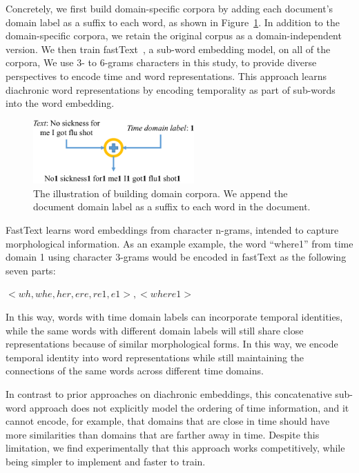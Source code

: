 Concretely,
we first build domain-specific corpora by adding each document's domain label as a suffix to each word, as shown in  Figure~\ref{chap3:fig:domain}. 
In addition to the domain-specific corpora,
we retain the original corpus as a domain-independent version.
We then train fastText~\cite{bojanowski2017enriching}, a sub-word embedding model, on all of the corpora,
We use 3- to 6-grams characters in this study, to provide  diverse perspectives to encode time and word representations. 
This approach learns diachronic word representations by encoding temporality as part of sub-words into the word embedding. 

\begin{figure}[htp]
\centering
\includegraphics[width=0.55\textwidth]{images/chapter3/domain_doc.pdf}
\caption{The illustration of building domain corpora. We append the document domain label as a suffix to each word in the document.}
\label{chap3:fig:domain}
\end{figure}

FastText learns word embeddings from character n-grams, intended to capture morphological information. As an example example, the word ``where1'' from time domain 1 using character 3-grams would be encoded in fastText as the following seven parts:
\begin{center}
    $<wh, whe, her, ere, re1, e1>, <where1>$
\end{center}

In this way, words with time domain labels can incorporate temporal identities, while the same words with different domain labels will still share close representations because of similar morphological forms. In this way, we encode temporal identity into word representations while still maintaining the connections of the same words across different time domains. 

In contrast to prior approaches on diachronic embeddings, this concatenative sub-word approach does not explicitly model the ordering of time information, and it cannot encode, for example, that domains that are close in time should have more similarities than domains that are farther away in time.
Despite this limitation, we find experimentally that this approach works competitively, while being simpler to implement and faster to train.


